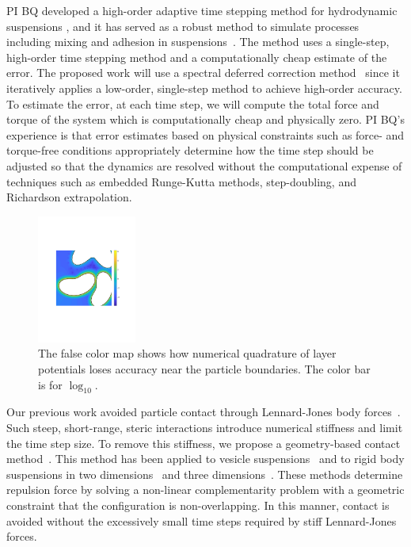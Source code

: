PI BQ developed a high-order adaptive time stepping method for
hydrodynamic suspensions \cite{qua-bir2016}, and it has served as a
robust method to simulate processes including mixing and adhesion in
suspensions~\cite{qua-vee-you2019, kab-qua-bir2017}. The method uses
a single-step, high-order time stepping method and a computationally
cheap estimate of the error. The proposed work will use a spectral
deferred correction method~\cite{dut-gre-rok2000} since it iteratively
applies a low-order, single-step method to achieve high-order accuracy.
To estimate the error, at each time step, we will compute the total force
and torque of the system which is computationally cheap and physically
zero. PI BQ's experience is that error estimates based on physical
constraints such as force- and torque-free conditions appropriately
determine how the time step should be adjusted so that the dynamics are
resolved without the computational expense of techniques such as
embedded Runge-Kutta methods, step-doubling, and Richardson
extrapolation.

%
\begin{figure}
\centerline{\includegraphics[width=0.29\textwidth]{figures/BIError.pdf}}
  \vspace{-8pt}
\caption{
\label{fig:bierror}  
\footnotesize The false color map shows how numerical quadrature of
  layer potentials loses accuracy near the particle boundaries.  The
  color bar is for $\log_{10}.$}
\end{figure}
%
Our previous work avoided particle contact through Lennard-Jones body
forces~\cite{Fu2018_SIAM}. Such steep, short-range, steric interactions 
introduce numerical stiffness and limit the time step size. To
remove this stiffness, we propose a geometry-based contact
method~\cite{har-pon-sor-zor2011}. This method has been applied to
vesicle suspensions~\cite{lu-rah-zor2017} and to rigid body suspensions in
two dimensions~\cite{bys-sha-qua2020} and three
dimensions~\cite{Yan2019}. These methods determine repulsion force by
solving a non-linear complementarity problem with a geometric constraint
that the configuration is non-overlapping. In this manner, contact is
avoided without the excessively small time steps required by stiff
Lennard-Jones forces.


